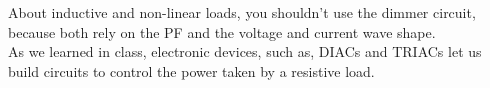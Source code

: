 \documentclass[journal]{IEEEtran}
\begin{document}
About inductive and non-linear loads, you shouldn't use 
the dimmer circuit, because both rely on the PF and the
voltage and current wave shape.\\

As we learned in class, electronic devices, such as,
DIACs and TRIACs let us build circuits to control the 
power taken by a resistive load.\\

\end{document}
